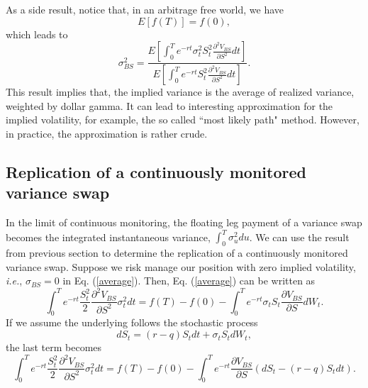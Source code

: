 \documentclass[12pt]{article}
\begin{document}
    As a side result, notice that, in an arbitrage free world, we have
    \begin{equation}
      E\left[f(T)\right]=f(0),
    \end{equation}
    which leads to
    \begin{equation}
      \sigma_{BS}^2=\frac{\displaystyle E\left[\int_0^Te^{-rt}\sigma_t^2S_t^2\frac{\partial^2 V_{BS}}{\partial S^2}dt\right]}
                         {\displaystyle E\left[\int_0^Te^{-rt}S_t^2\frac{\partial^2 V_{BS}}{\partial S^2}dt\right]}.
    \end{equation}
    This result implies that, the implied variance is the average of realized variance,
    weighted by dollar gamma. It can lead to interesting approximation for the implied
    volatility, for example, the so called ``most likely path" method. However, in practice, the approximation is rather crude.

  \subsection{Replication of a continuously monitored variance swap}

    In the limit of continuous monitoring, the floating leg payment of a variance swap becomes the integrated instantaneous
    variance, $\int_0^T\sigma_u^2du$. We can use the result from previous section to determine the replication of a
    continuously monitored variance swap.
    Suppose we risk manage our position with zero implied volatility, {\it i.e.}, $\sigma_{BS}=0$ in Eq. (\ref{average}). Then,
    Eq. (\ref{average}) can be written as
    \begin{equation}
      \int_0^Te^{-rt}\frac{S_t^2}{2}\frac{\partial^2 V_{BS}}{\partial S^2}\sigma_t^2dt
      =f(T)-f(0)-\int_0^Te^{-rt}\sigma_tS_t\frac{\partial V_{BS}}{\partial S}dW_t.
    \end{equation}
    If we assume the underlying follows the stochastic process
    \begin{equation}
      dS_t=(r-q)S_tdt+\sigma_tS_tdW_t,
    \end{equation}
    the last term becomes
    \begin{equation}
      \int_0^Te^{-rt}\frac{S_t^2}{2}\frac{\partial^2 V_{BS}}{\partial S^2}\sigma_t^2dt
      =f(T)-f(0)-\int_0^Te^{-rt}\frac{\partial V_{BS}}{\partial S}\left(dS_t-(r-q)S_tdt\right).
      \label{rep1}
    \end{equation}
\end{document}
